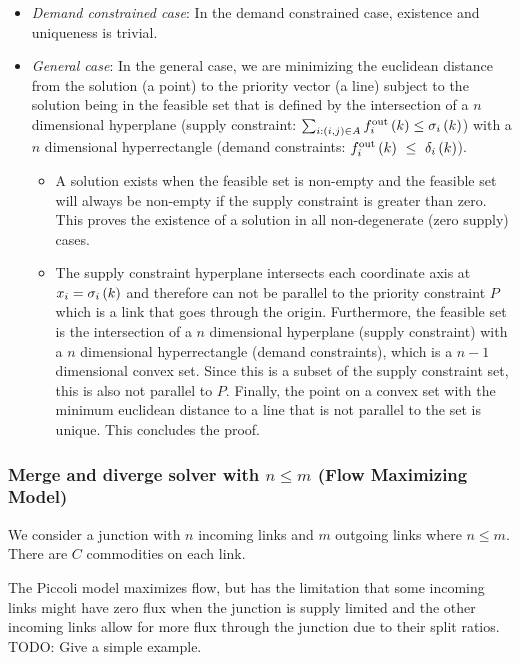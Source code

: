 \begin{itemize}
	\item \textit{Demand constrained case}: In the demand constrained case, existence and uniqueness is trivial. 

	\item \textit{General case}: In the general case, we are minimizing the euclidean distance from the solution (a point) to the priority vector (a line) subject to the solution being in the feasible set that is defined by the intersection of a $n$ dimensional hyperplane (supply constraint: $\sum_{i: (i,j)\in A} f_{i}^{\text{out}}\left(k\right) \leq \sigma_{i}\left(k\right)$) with a $n$ dimensional hyperrectangle (demand constraints: $f_{i}^{\text{out}}\left(k\right)~\leq~{\delta_{i}\left(k\right)}$).
	\begin{itemize}
		\item  A solution exists when the feasible set is non-empty and the feasible set will always be non-empty if the supply constraint is greater than zero. This proves the existence of a solution in all non-degenerate (zero supply) cases. 

		\item The supply constraint hyperplane intersects each coordinate axis at $x_i = \sigma_{i}\left(k\right)$ and therefore can not be parallel to the priority constraint $P$ which is a link that goes through the origin. Furthermore, the feasible set is the intersection of a $n$ dimensional hyperplane (supply constraint) with a $n$ dimensional hyperrectangle (demand constraints), which is a $n-1$ dimensional convex set. Since this is a subset of the supply constraint set, this is also not parallel to $P$. Finally, the point on a convex set with the minimum euclidean distance to a line that is not parallel to the set is unique. This concludes the proof. 
	\end{itemize}
\end{itemize}


\subsubsection{Merge and diverge solver with $n \leq{m}$ (Flow Maximizing Model)} 

We consider a junction with $n$ incoming links and $m$ outgoing links where $n \leq{m}$. There are $C$ commodities on each link.

\begin{remark}
The Piccoli model maximizes flow, but has the limitation that some incoming links might have zero flux when the junction is supply limited and the other incoming links allow for more flux through the junction due to their split ratios.\\

\noindent TODO: Give a simple example.
\end{remark}

